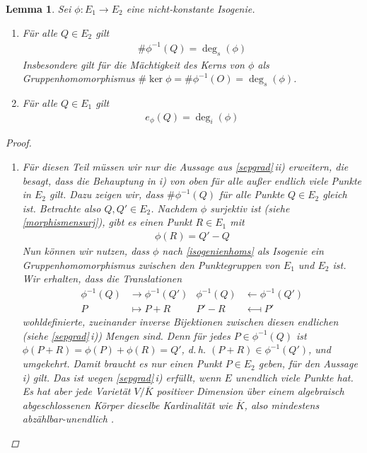 \documentclass[english, german, parskip=half]{scrartcl}
\newtheorem{Lemma}[Satz]{Lemma}
\theoremstyle{definition}
\theoremstyle{remark}
\newcommand*{\algK}{\ensuremath{\overline K}} %
\newcommand*{\longto}{\longrightarrow}
\newcommand*{\longfrom}{\longleftarrow}
\newcommand*{\degs}{\operatorname{\deg}_s} %
\newcommand*{\degi}{\operatorname{\deg}_i} %
\renewcommand{\O}{O}
\begin{document}
\begin{Lemma}\label{sepgrad2}
  Sei $\phi\colon E_1\to E_2$ eine nicht-konstante Isogenie.
  \begin{enumerate}[label=\roman*)]
  \item Für alle $Q\in E_2$ gilt
    \begin{gather*}
      \#\phi^{-1}(Q) = \degs(\phi)
    \end{gather*}
    Insbesondere gilt für die Mächtigkeit des Kerns von $\phi$ als
    Gruppenhomomorphismus 
    $\#\ker\phi=\#\phi^{-1}(\O)=\degs(\phi)$.
  \item Für alle $Q\in E_1$ gilt
    \begin{gather*}
      e_{\phi}(Q) = \degi(\phi)
    \end{gather*}
  \end{enumerate}
\begin{proof}~
  \begin{enumerate}[label=\roman*)]
  \item Für diesen Teil müssen wir nur die Aussage aus
    \autoref{sepgrad}\,ii) erweitern, die besagt, dass die Behauptung
    in \emph{i)} von oben für alle außer endlich viele Punkte in $E_2$
    gilt. Dazu zeigen wir, dass $\#\phi^{-1}(Q)$ für alle Punkte $Q\in
    E_2$ gleich ist. 
    Betrachte also $Q,Q'\in E_2$. Nachdem $\phi$ surjektiv ist
    (siehe \autoref{morphismensurj}), gibt es einen Punkt $R\in E_1$ mit
    \begin{gather*}
      \phi(R) = Q' - Q
    \end{gather*}
    Nun können wir nutzen, dass $\phi$  nach \autoref{isogenienhoms} als
    Isogenie ein Gruppenhomomorphismus zwischen den Punktegruppen von
    $E_1$ und $E_2$ ist. Wir erhalten, dass die Translationen
    \begin{align*}
      \phi^{-1}(Q) &\longto \phi^{-1}(Q')
      &\phi^{-1}(Q) &\longfrom \phi^{-1}(Q')\\
      P &\longmapsto P+R
      &P'-R &\longmapsfrom P'
    \end{align*}
    wohldefinierte, zueinander inverse Bijektionen zwischen diesen
    endlichen (siehe \autoref{sepgrad}\,\emph{i)}) Mengen sind.
    Denn für jedes $P\in\phi^{-1}(Q)$ ist
    $\phi(P+R)=\phi(P)+\phi(R)=Q'$, d.\,h. $(P+R)\in\phi^{-1}(Q')$,
    und umgekehrt.
    Damit braucht es nur einen Punkt $P\in E_2$ geben, für den Aussage
    \emph{i)} gilt. Das ist wegen \autoref{sepgrad}\,\emph{i)} erfüllt,
    wenn $E$ unendlich viele Punkte hat.
    Es hat aber jede Varietät $V/\algK$ positiver Dimension
    über einem algebraisch abgeschlossenen Körper dieselbe
    Kardinalität wie $\algK$, also mindestens abzählbar-unendlich
    \cite[siehe][Exercise I.4.8 oder Section I.6]{hartshorne}.
    

\end{enumerate}
\end{proof}
\end{Lemma}
\end{document}
